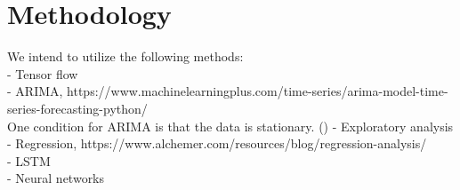 \section{Methodology}

We intend to utilize the following methods:\\
- Tensor flow \\
- ARIMA, https://www.machinelearningplus.com/time-series/arima-model-time-series-forecasting-python/ \\
One condition for ARIMA is that the data is stationary. (\cite[p.~291]{hyndman_athanasopoulos_2021})
- Exploratory analysis \\
- Regression, https://www.alchemer.com/resources/blog/regression-analysis/\\ 
- LSTM\\
- Neural networks